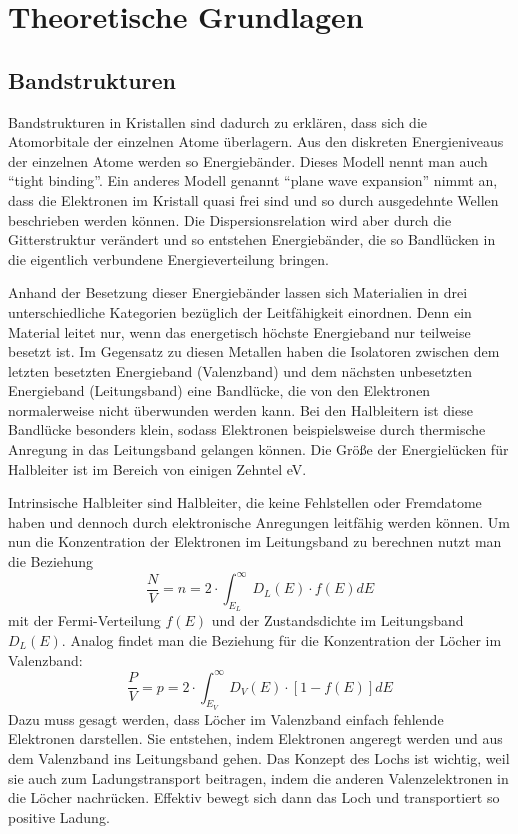 \section{Theoretische Grundlagen}
\subsection{Bandstrukturen}
Bandstrukturen in Kristallen sind dadurch zu erklären, dass sich die Atomorbitale der einzelnen Atome überlagern. Aus den diskreten Energieniveaus der einzelnen Atome werden so Energiebänder. Dieses Modell nennt man auch ``tight binding''. Ein anderes Modell genannt ``plane wave expansion'' nimmt an, dass die Elektronen im Kristall quasi frei sind und so durch ausgedehnte Wellen beschrieben werden können. Die Dispersionsrelation wird aber durch die Gitterstruktur verändert und so entstehen Energiebänder, die so Bandlücken in die eigentlich verbundene Energieverteilung bringen.

Anhand der Besetzung dieser Energiebänder lassen sich Materialien in drei unterschiedliche Kategorien bezüglich der Leitfähigkeit einordnen. Denn ein Material leitet nur, wenn das energetisch höchste Energieband nur teilweise besetzt ist. Im Gegensatz zu diesen Metallen haben die Isolatoren zwischen dem letzten besetzten Energieband (Valenzband) und dem nächsten unbesetzten Energieband (Leitungsband) eine Bandlücke, die von den Elektronen normalerweise nicht überwunden werden kann. Bei den Halbleitern ist diese Bandlücke besonders klein, sodass Elektronen beispielsweise durch thermische Anregung in das Leitungsband gelangen können. Die Größe der Energielücken für Halbleiter ist im Bereich von einigen Zehntel eV.

Intrinsische Halbleiter sind Halbleiter, die keine Fehlstellen oder Fremdatome haben und dennoch durch elektronische Anregungen leitfähig werden können. Um nun die Konzentration der Elektronen im Leitungsband zu berechnen nutzt man die Beziehung
\begin{equation}
\frac{N}{V}=n = 2\cdot \int_{E_L}^\infty D_L(E)\cdot f(E)dE
\end{equation}
mit der Fermi-Verteilung $f(E)$ und der Zustandsdichte im Leitungsband $D_L(E)$.
Analog findet man die Beziehung für die Konzentration der Löcher im Valenzband:
\begin{equation}
 \frac{P}{V}=p = 2\cdot \int_{E_V}^\infty D_V(E)\cdot [1-f(E)]dE
\end{equation}
Dazu muss gesagt werden, dass Löcher im Valenzband einfach fehlende Elektronen darstellen. Sie entstehen, indem Elektronen angeregt werden und aus dem Valenzband ins Leitungsband gehen. Das Konzept des Lochs ist wichtig, weil sie auch zum Ladungstransport beitragen, indem die anderen Valenzelektronen in die Löcher nachrücken. Effektiv bewegt sich dann das Loch und transportiert so positive Ladung.

